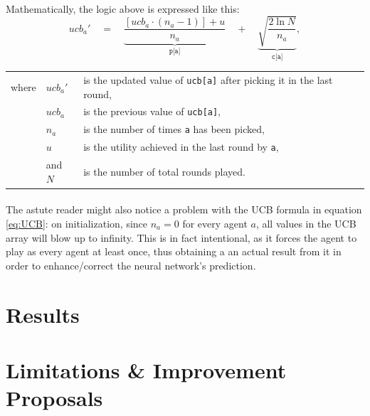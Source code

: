 \documentclass[12pt]{article}
\numberwithin{equation}{section}
\begin{document}
			\paragraph*{}
				Mathematically, the logic above is expressed like this:
				\begin{equation} \label{eq:UCB}
					{ucb_{a}}' \quad = \quad \underbrace{\frac{[ucb_{a} \cdot (n_{a}-1)]+u}{n_{a}}}_{\texttt{p[a]}} \quad + \quad \underbrace{\sqrt{\frac{2 \ln N}{n_{a}}}}_{\texttt{c[a]}},
				\end{equation}
				\vspace{-0.5cm}		%
				\renewcommand{\arraystretch}{1} %
				\begin{longtable}{l l l}
					where 	& ${ucb_{a}}'$	& is the updated value of \texttt{ucb[a]} after picking it in the last round, \\
							& $ucb_{a}$  	& is the previous value of \texttt{ucb[a]}, \\
							& $n_{a}$ 		& is the number of times \texttt{a} has been picked, \\
							& $u$ 			& is the utility achieved in the last round by \texttt{a}, \\
							& and $N$ 		& is the number of total rounds played. \\
				\end{longtable}

			\paragraph*{}
				The astute reader might also notice a problem with the UCB formula in equation \ref{eq:UCB}: on initialization, since $n_{a}=0$ for every agent $a$, all values in the UCB array will blow up to infinity. This is in fact intentional, as it forces the agent to play as every agent at least once, thus obtaining a an actual result from it in order to enhance/correct the neural network's prediction.

	\section{Results}		\label{sec:results}	%

	\section{Limitations \& Improvement Proposals}		\label{sec:limitations_improvements}
	
\end{document}
